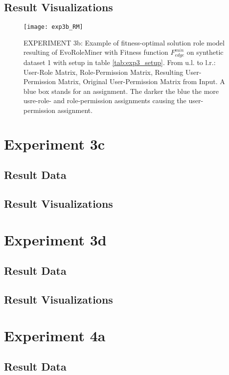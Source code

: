 	\subsection{Result Visualizations}
	\label{sec:A_Exp3b_Diagrams}
		\begin{figure}[H]
			\centering
			\texttt{[image: exp3b\_RM]}
			\caption{EXPERIMENT 3b: Example of fitness-optimal solution role model resulting of EvoRoleMiner with Fitness function $F_{edge}^{min}$ on synthetic dataset 1 with setup in table \ref{tab:exp3_setup}. From u.l. to l.r.: User-Role Matrix, Role-Permission Matrix, Resulting User-Permission Matrix, Original User-Permission Matrix from Input. A blue box stands for an assignment. The darker the blue the more usre-role- and role-permission assignments causing the user-permission assignment.}
			\label{fig:exp3b_RM}
		\end{figure}

\section{Experiment 3c}
\label{sec:A_Exp3c}
	\subsection{Result Data}
	\label{sec:A_Exp3c_Data}
	\subsection{Result Visualizations}
	\label{sec:A_Exp3c_Diagrams}

\section{Experiment 3d}
\label{sec:A_Exp3d}
	\subsection{Result Data}
	\label{sec:A_Exp3d_Data}
	\subsection{Result Visualizations}
	\label{sec:A_Exp3d_Diagrams}

\section{Experiment 4a}
\label{sec:A_Exp4a}
	\subsection{Result Data}
	\label{sec:A_Exp4a_Data}
